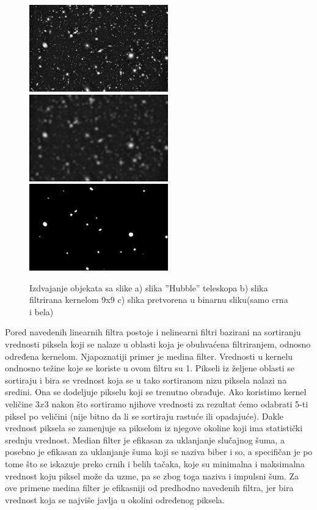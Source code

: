 \documentclass[a4paper,12pt,titlepage]{article}
\begin{document}
\begin{figure}[ht!]
\centering
\includegraphics[width=60mm]{img/tel.jpg}
\includegraphics[width=60mm]{img/telAvg.jpg}
\includegraphics[width=60mm]{img/telTh.jpg}
\caption{Izdvajanje objekata sa slike a) slika ''Hubble'' teleskopa b) slika filtrirana kernelom 9x9 c) slika pretvorena u binarnu sliku(samo crna i bela)}
\label{overflow}
\end{figure}

Pored navedenih linearnih filtra postoje i nelinearni filtri bazirani na sortiranju vrednosti piksela koji se nalaze u oblasti koja je obuhvaćena filtriranjem, odnosno određena kernelom. Njapoznatiji primer je medina filter. Vrednosti u kernelu ondnosno težine koje se koriste u ovom filtru su 1. Pikseli iz željene oblasti se sortiraju i bira se vrednost koja se u tako sortiranom nizu piksela nalazi na sredini. Ona se dodeljuje pikselu koji se trenutno obrađuje. Ako koristimo kernel veličine $3 x 3$ nakon što sortiramo njihove vrednosti za rezultat ćemo odabrati 5-ti piksel po veličini (nije bitno da li se sortiraju rastuće ili opadajuće). Dakle vrednost piksela se zamenjuje sa pikselom iz njegove okoline koji ima statistički srednju vrednost. Median filter je efikasan za uklanjanje slučajnog šuma, a posebno je efikasan za uklanjanje šuma koji se naziva biber i so, a specifičan je po tome što se iskazuje preko crnih i belih tačaka, koje su minimalna i maksimalna vrednost koju piksel može da uzme, pa se zbog toga naziva i impulsni šum. Za ove primene medina filter je efikasniji od predhodno navedenih filtra, jer bira vrednost koja se najviše javlja u okolini određenog piksela.
\end{document}
